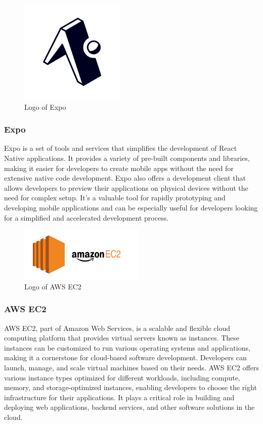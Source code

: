 \documentclass[conference]{IEEEtran}
\begin{document}
        \begin{figure}[htbp]
        \centerline{\includegraphics[width=5cm]{Images/logo/expo.png}}
        \label{fig}
        \caption{Logo of Expo}
        \end{figure}
        \subsubsection{Expo}
        Expo is a set of tools and services that simplifies the development of React Native applications. It provides a variety of pre-built components and libraries, making it easier for developers to create mobile apps without the need for extensive native code development. Expo also offers a development client that allows developers to preview their applications on physical devices without the need for complex setup. It's a valuable tool for rapidly prototyping and developing mobile applications and can be especially useful for developers looking for a simplified and accelerated development process.\\

        \begin{figure}[htbp]
        \centerline{\includegraphics[width=6cm]{Images/logo/aws.png}}
        \label{fig}
        \caption{Logo of AWS EC2}
        \end{figure}
        \subsubsection{AWS EC2}
        AWS EC2, part of Amazon Web Services, is a scalable and flexible cloud computing platform that provides virtual servers known as instances. These instances can be customized to run various operating systems and applications, making it a cornerstone for cloud-based software development. Developers can launch, manage, and scale virtual machines based on their needs. AWS EC2 offers various instance types optimized for different workloads, including compute, memory, and storage-optimized instances, enabling developers to choose the right infrastructure for their applications. It plays a critical role in building and deploying web applications, backend services, and other software solutions in the cloud.\\
        
\end{document}

